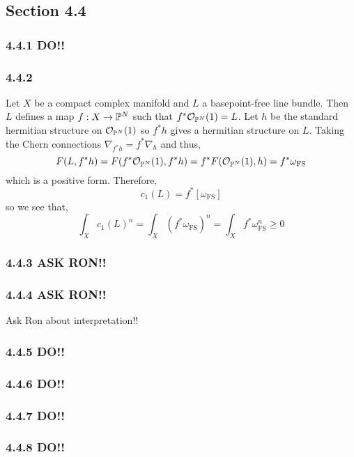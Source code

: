 \documentclass[12pt]{article}
\begin{document}
\subsection{Section 4.4}

\subsubsection{4.4.1 DO!!}

\subsubsection{4.4.2}

Let $X$ be a compact complex manifold and $L$ a basepoint-free line bundle. Then $L$ defines a map $f : X \to \P^N$ such that $f^* \struct{\P^N}(1) = L$. Let $h$ be the standard hermitian structure on $\struct{\P^N}(1)$ so $f^* h$ gives a hermitian structure on $L$. Taking the Chern connections $\nabla_{f^* h} = f^* \nabla_h$ and thus,
\[ F(L, f^* h) = F(f^* \struct{\P^N}(1), f^* h) = f^* F(\struct{\P^N}(1), h) = f^* \omega_{\text{FS}} \]
which is a positive form.
Therefore,
\[ c_1(L) = f^* [\omega_{\text{FS}}] \] so we see that,
\[ \int_{X} c_1(L)^{n} = \int_X (f^* \omega_{\text{FS}})^{n} = \int_X f^* \omega_{\text{FS}}^n \ge 0 \]

\subsubsection{4.4.3 ASK RON!!}

\subsubsection{4.4.4 ASK RON!!}

Ask Ron about interpretation!!

\subsubsection{4.4.5 DO!!}

\subsubsection{4.4.6 DO!!}

\subsubsection{4.4.7 DO!!}

\subsubsection{4.4.8 DO!!}
\end{document}
